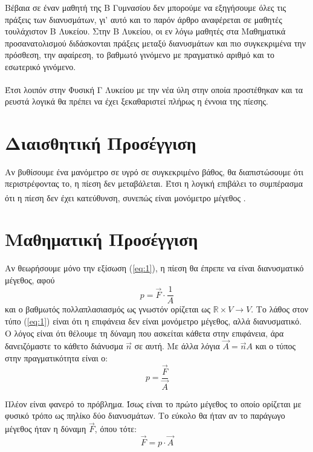 \documentclass[12pt,titlepage]{article}
\begin{document}
Βέβαια σε έναν μαθητή της Β Γυμνασίου δεν μπορούμε να εξηγήσουμε όλες τις πράξεις των διανυσμάτων, γι' αυτό και το παρόν άρθρο αναφέρεται σε μαθητές τουλάχιστον Β Λυκείου. Στην Β Λυκείου, οι εν λόγω μαθητές στα Μαθηματικά προσανατολισμού διδάσκονται πράξεις μεταξύ διανυσμάτων και πιο συγκεκριμένα την πρόσθεση, την αφαίρεση, το βαθμωτό γινόμενο με πραγματικό αριθμό και το εσωτερικό γινόμενο.

Έτσι λοιπόν στην Φυσική Γ Λυκείου\textsuperscript{\cite{fysikiG}} με την νέα ύλη στην οποία προστέθηκαν και τα ρευστά λογικά θα πρέπει να έχει ξεκαθαριστεί πλήρως η έννοια της πίεσης.

\section{Διαισθητική Προσέγγιση}

Αν βυθίσουμε ένα μανόμετρο σε υγρό σε συγκεκριμένο βάθος, θα διαπιστώσουμε ότι περιστρέφοντας το, η πίεση δεν μεταβάλεται. Έτσι η λογική επιβάλει το συμπέρασμα ότι η πίεση δεν έχει κατεύθυνση, συνεπώς είναι μονόμετρο μέγεθος \textsuperscript{\cite{Halliday1}}.

\section{Μαθηματική Προσέγγιση}
Αν θεωρήσουμε μόνο την εξίσωση (\ref{eq:1}), η πίεση θα έπρεπε να είναι διανυσματικό μέγεθος, αφού
\begin{equation} \label{eq:4}
 p=\vec{F}\cdot\frac{1}{A}
\end{equation}
και ο βαθμωτός πολλαπλασιασμός ως γνωστόν ορίζεται ως $\mathbb{R} \times V \to V$. Το λάθος στον τύπο (\ref{eq:1}) είναι ότι η επιφάνεια δεν είναι μονόμετρο μέγεθος, αλλά διανυσματικό. Ο λόγος είναι ότι θέλουμε τη δύναμη που ασκείται κάθετα στην επιφάνεια, άρα δανειζόμαστε το κάθετο διάνυσμα $\vec{n}$ σε αυτή. Με άλλα λόγια $\vec{Α}=\vec{n}Α$ και ο τύπος στην πραγματικότητα είναι ο:
\begin{equation} \label{eq:2}
 p=\frac{\vec{F}}{\vec{A}}
\end{equation}

Πλέον είναι φανερό το πρόβλημα. Ίσως είναι το πρώτο μέγεθος το οποίο ορίζεται με φυσικό τρόπο ως πηλίκο δύο διανυσμάτων. Το εύκολο θα ήταν αν το παράγωγο μέγεθος ήταν η δύναμη $\vec{F}$, όπου τότε:
\begin{equation} \label{eq:3}
 \vec{F}=p\cdot \vec{A}
\end{equation}
\end{document}
